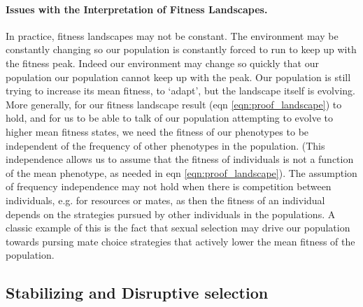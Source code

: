 \paragraph{Issues with the Interpretation of Fitness Landscapes.}
In practice, fitness landscapes may not be constant. The environment
may be constantly changing so our population is constantly forced to run to keep
up with the fitness peak. Indeed our environment may change so quickly
that our population our population cannot keep up with the peak. Our
population is still trying to increase its mean fitness, to `adapt', but
the landscape itself is evolving.
More generally, for our fitness landscape result (eqn \eqref{eqn:proof_landscape}) to hold, and
for us to be able to talk of our population attempting to evolve to
higher mean fitness states,  we need the fitness of our phenotypes to be independent of the
frequency of other phenotypes in the population. (This independence allows us to
assume that the fitness of individuals is not a function of the mean
phenotype, as needed in eqn \eqref{eqn:proof_landscape}).  The
assumption of frequency independence may not hold when there is competition between individuals, e.g. for resources or
mates, as then the fitness of an individual depends on the strategies pursued
by other individuals in the populations. A classic example of this is
the fact that sexual selection may drive our
population towards pursing mate choice strategies that actively lower
the mean fitness of the population. 


 \subsection{Stabilizing and Disruptive selection}

